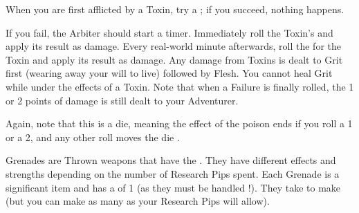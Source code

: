   When you are first afflicted by a Toxin, try a ; if you succeed, nothing happens.

  If you fail, the Arbiter should start a timer. Immediately roll the Toxin's \Duration and apply its result as damage. Every real-world minute afterwards, roll the \Duration for the Toxin and apply its result as damage. Any damage from Toxins is dealt to Grit first (wearing away your will to live) followed by Flesh. You cannot heal Grit while under the effects of a Toxin.  Note that when a Failure is finally rolled, the 1 or 2 points of damage is still dealt to your Adventurer.

 Again, note that this is a  die, meaning the effect of the poison ends if you roll a 1 or a 2, and any other roll moves the die \DCDOWN.


\cbreak




\newpage





Grenades are Thrown \INT weapons that have the . They have different effects and strengths depending on the number of Research Pips spent. Each Grenade is a significant item and has a  of 1 (as they must be handled !). They take  to make (but you can make as many as your Research Pips will allow).




